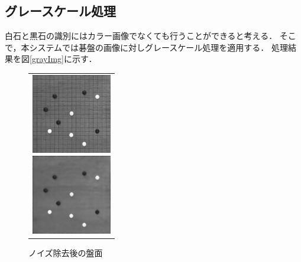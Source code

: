 \documentclass[openright]{nitocs}
\numberwithin{equation}{section}
\begin{document}
        \subsection{グレースケール処理} \label{grayscale}
            白石と黒石の識別にはカラー画像でなくても行うことができると考える．
            そこで，本システムでは碁盤の画像に対しグレースケール処理を適用する．
            処理結果を図\ref{grayImg}に示す．
            \begin{figure}[tb] %
                \begin{center}
                  \begin{tabular}{c}
                    \begin{minipage}{0.5\hsize}
                      \begin{center}
                        \includegraphics[clip,width=35mm]{DSC_0041/GRAYImg.jpg}
                    \caption{グレースケール処理}
                    \label{grayImg}
                      \end{center}
                    \end{minipage}
                    \begin{minipage}{0.5\hsize}
                      \begin{center}
                        \includegraphics[clip,width=35mm]{DSC_0041/noiseReducedImg.jpg}
                    \caption{ノイズ除去後の盤面}
                    \label{noiseReducedImg}
                      \end{center}
                    \end{minipage}
                  \end{tabular}
                \end{center}
            \end{figure}
\end{document}
